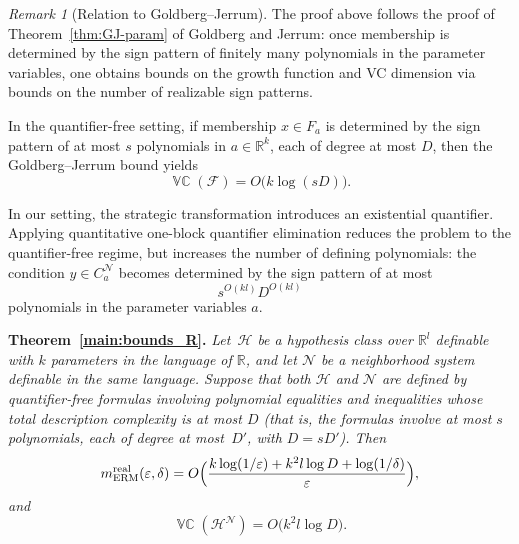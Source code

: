 \documentclass[11pt]{article}
\theoremstyle{plain}
\theoremstyle{definition}
\theoremstyle{remark}
\newtheorem{remark}[theorem]{Remark}
\newenvironment{restatedtheorem}[1]
  {\par\noindent\textbf{Theorem~\ref{#1}.}\itshape}
  {\par}
\DeclareMathOperator{\VCdim}{\mathbb{VC}}
\newcommand{\R}{\mathbb{R}}
\begin{document}
\begin{remark}[Relation to Goldberg--Jerrum]
The proof above follows the proof of Theorem~\ref{thm:GJ-param} of Goldberg and Jerrum:
once membership is determined by the sign pattern of finitely many
polynomials in the parameter variables, one obtains bounds on the growth
function and VC dimension via bounds on the number of realizable sign
patterns.

In the quantifier-free setting, if membership $x\in F_a$ is determined by
the sign pattern of at most $s$ polynomials in $a\in\R^k$, each of degree
at most $D$, then the Goldberg--Jerrum bound yields
\[
\VCdim(\mathcal F)=O\bigl(k\log(sD)\bigr).
\]

In our setting, the strategic transformation introduces an existential
quantifier. Applying quantitative one-block quantifier elimination reduces
the problem to the quantifier-free regime, but increases the number of
defining polynomials: the condition $y\in C_a^{\mathcal N}$ becomes
determined by the sign pattern of at most
\[
s^{O(kl)}D^{O(kl)}
\]
polynomials in the parameter variables $a$.

\end{remark}



\begin{restatedtheorem}{main:bounds_R}
Let~$\mathcal{H}$ be a hypothesis class over $\mathbb R^l$ definable with $k$ parameters in the language of $\mathbb{R}$, and let $\mathcal N$ be a neighborhood system definable in the same language. Suppose that both $\mathcal H$ and $\mathcal N$ are defined by quantifier-free formulas involving polynomial equalities and inequalities whose \emph{total description complexity} is at most $D$ (that is, the formulas involve at most $s$ polynomials, each of degree at most~$D'$, with $D = sD'$). 
Then
\[
  m_{\mathrm{ERM}}^{\mathrm{real}}(\varepsilon,\delta)
  =
  O\Bigl(
    \frac{
      k\log(1/\varepsilon)
      + k^2 l \log D
      + \log(1/\delta)
    }{\varepsilon}
  \Bigr),
\]
and
\[
  \VCdim(\mathcal H^\mathcal N)
  =
  O\bigl(k^2 l \log D\bigr).
\]
\end{restatedtheorem}
\end{document}
